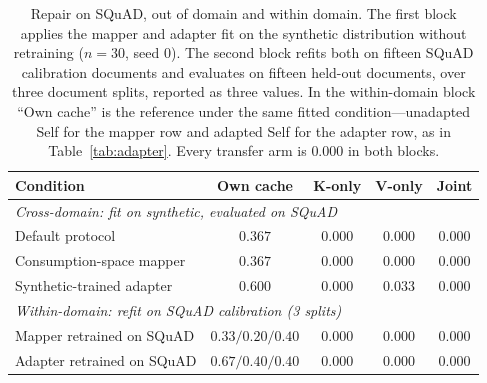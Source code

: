 \documentclass[11pt]{article}
\begin{document}
\begin{table}[t]
\centering
\small
\caption{Repair on SQuAD, out of domain and within domain. The first block
applies the mapper and adapter fit on the synthetic distribution without
retraining ($n=30$, seed 0). The second block refits both on fifteen SQuAD
calibration documents and evaluates on fifteen held-out documents, over three
document splits, reported as three values. In the within-domain block ``Own
cache'' is the reference under the same fitted condition---unadapted Self for the
mapper row and adapted Self for the adapter row, as in Table~\ref{tab:adapter}.
Every transfer arm is $0.000$ in both blocks.}
\label{tab:squadrepair}
\begin{tabular}{lcccc}
\toprule
Condition & Own cache & K-only & V-only & Joint \\
\midrule
\multicolumn{5}{l}{\emph{Cross-domain: fit on synthetic, evaluated on SQuAD}}\\
Default protocol              & $0.367$ & $0.000$ & $0.000$ & $0.000$ \\
Consumption-space mapper      & $0.367$ & $0.000$ & $0.000$ & $0.000$ \\
Synthetic-trained adapter     & $0.600$ & $0.000$ & $0.033$ & $0.000$ \\
\midrule
\multicolumn{5}{l}{\emph{Within-domain: refit on SQuAD calibration (3 splits)}}\\
Mapper retrained on SQuAD      & $0.33/0.20/0.40$ & $0.000$ & $0.000$ & $0.000$ \\
Adapter retrained on SQuAD     & $0.67/0.40/0.40$ & $0.000$ & $0.000$ & $0.000$ \\
\bottomrule
\end{tabular}
\end{table}
\end{document}
